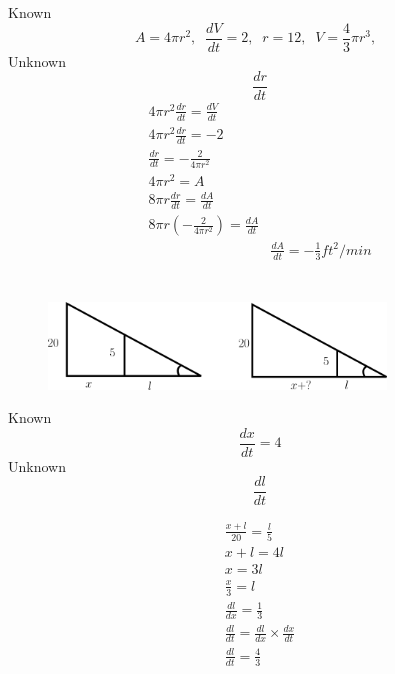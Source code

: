 \documentclass[16pt letter]{article}
\begin{document}
Known \[A = 4 \pi r^2, \;\; \frac{dV}{dt} = 2, \;\; r = 12, \;\; V = \frac{4}{3} \pi r^3, \;\;\]
Unknown \[\frac{dr}{dt}\]
\begin{align*}
	4 \pi  r^2 \frac{dr}{dt} = \frac{dV}{dt}        \\
	4 \pi r^2 \frac{dr}{dt} = -2                    \\
	\frac{dr}{dt} = -\frac{2}{4 \pi r^2}            \\[20pt]
	4 \pi r^2 = A                                   \\
	8 \pi  r \frac{dr}{dt} = \frac{dA}{dt}          \\
	8 \pi  r (-\frac{2}{4 \pi r^2}) = \frac{dA}{dt} \\
	 & \frac{dA}{dt} = -\frac{1}{3} ft^2/min
\end{align*}
\pagebreak

\section{}
\label{q:3}

\begin{figure}[h]
	\centering
	\includegraphics[width=0.80\textwidth]{Application Q3}
\end{figure}

Known \[\frac{dx}{dt} = 4\]
Unknown \[\frac{dl}{dt}\]

\begin{align*}
	\frac{x+l}{20} = \frac{l}{5}                        \\
	x + l = 4l                                          \\
	x = 3l                                              \\
	\frac{x}{3} = l                                     \\
	\frac{dl}{dx} = \frac{1}{3}                         \\[20pt]
	\frac{dl}{dt} = \frac{dl}{dx}  \times \frac{dx}{dt} \\
	\frac{dl}{dt} = \frac{4}{3}                         \\
\end{align*}

\subsection{}
\end{document}
